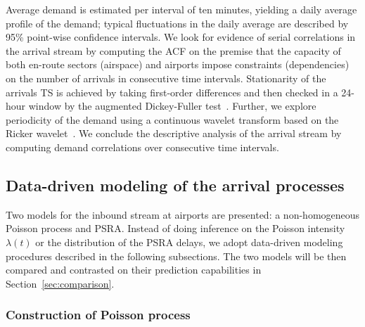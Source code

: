 \documentclass[]{elsarticle}
\begin{document}
Average demand is estimated per interval of ten minutes, yielding a daily average profile of the demand; typical fluctuations in the daily average are described by 95\% point-wise confidence intervals.
We look for evidence of serial correlations in the arrival stream by computing the \ac{ACF} on the premise that the capacity of both en-route sectors (airspace) and airports impose constraints (dependencies) on the number of arrivals in consecutive time intervals.
Stationarity of the arrivals \acs{TS} is achieved by taking first-order differences and then checked in a 24-hour window by the augmented Dickey-Fuller test~\citep{fuller2009introduction,seabold2010statsmodels}.
Further, we explore periodicity of the demand using a continuous wavelet transform based on the Ricker wavelet~\citep{ricker}.
We conclude the descriptive analysis of the arrival stream by computing demand correlations over consecutive time intervals.

\subsection{Data-driven modeling of the arrival processes}\label{sec:dm_modeling}

Two models for the inbound stream at airports are presented: a non-homogeneous Poisson process and \ac{PSRA}.
Instead of doing inference on the Poisson intensity \(\lambda(t)\) or the distribution of the \ac{PSRA} delays, we adopt data-driven modeling procedures described in the following subsections.
The two models will be then compared and contrasted on their prediction capabilities in Section~\ref{sec:comparison}.

\subsubsection{Construction of Poisson process}\label{sec:dm_pois}
\end{document}
